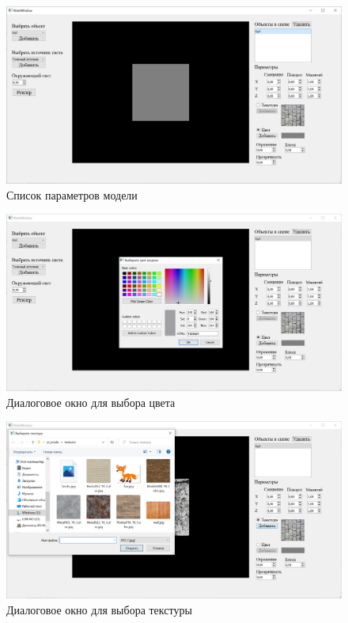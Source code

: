 \documentclass[12pt,a4paper,oneside]{report}
\begin{document}
	\begin{figure}[H]
		\centering
		\includegraphics[scale = 0.5]{list_params}
		\caption{Список параметров модели}
	\end{figure}

	\begin{figure}[H]
		\centering
		\includegraphics[scale = 0.5]{color_dialog}
		\caption{Диалоговое окно для выбора цвета}
	\end{figure}

	\begin{figure}[H]
		\centering
		\includegraphics[scale = 0.5]{texture_dialog}
		\caption{Диалоговое окно для выбора текстуры}
	\end{figure}
\end{document}
